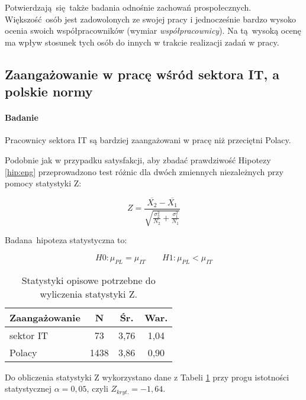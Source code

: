 Potwierdzają się także badania odnośnie zachowań prospołecznych. Większość osób jest zadowolonych ze swojej pracy i jednocześnie bardzo wysoko ocenia swoich współpracowników (wymiar \textit{współpracownicy}). Na tą wysoką ocenę ma wpływ stosunek tych osób do innych w trakcie realizacji zadań w pracy.
\subsection{Zaangażowanie w pracę wśród sektora IT, a polskie normy}
\paragraph{Badanie}
\begin{hyp}
  Pracownicy sektora IT są bardziej zaangażowani w pracę niż przeciętni Polacy.
  \label{hip:eng}
\end{hyp}

Podobnie jak w przypadku satysfakcji, aby zbadać prawdziwość Hipotezy \ref{hip:eng} przeprowadzono test różnic dla dwóch zmiennych niezależnych przy pomocy statystyki Z:

\begin{equation}
  Z = \frac{\overline{X_2} - \overline{X_1}}{\sqrt{\frac{\sigma^2_2}{N_2}+\frac{\sigma^2_1}{N_1}}}
\end{equation}

Badana hipoteza statystyczna  to:

\begin{equation}
  H0: \mu_{PL} = \mu_{IT} \qquad H1: \mu_{PL} < \mu_{IT}
\end{equation}

\begin{table}[h!b]
  \begin{center}
    \begin{tabular}{l | c c c }
      Zaangażowanie & N & Śr. & War. \\ \hline
      sektor IT & 73 & 3,76 & 1,04 \\
      Polacy & 1438 & 3,86 & 0,90 \\
    \end{tabular}
  \end{center}
  \caption{Statystyki opisowe potrzebne do wyliczenia statystyki Z.}
  \label{tab:uwes-norms-data}
\end{table}

Do obliczenia statystyki Z wykorzystano dane z Tabeli \ref{tab:uwes-norms-data} przy progu istotności statystycznej $\alpha = 0,05$, czyli $Z_{kryt.} = -1,64$.

